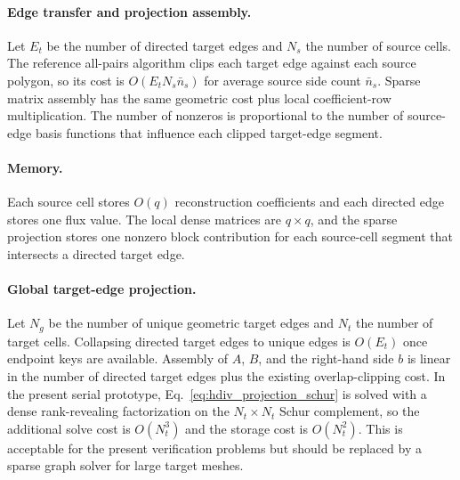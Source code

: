 \documentclass[11pt]{article}
\begin{document}
\paragraph{Edge transfer and projection assembly.}
Let \(E_t\) be the number of directed target edges and \(N_s\) the number of
source cells.  The reference all-pairs algorithm clips each target edge
against each source polygon, so its cost is \(O(E_t N_s \bar n_s)\) for average
source side count \(\bar n_s\).  Sparse matrix assembly has the same geometric
cost plus local coefficient-row multiplication.  The number of nonzeros is
proportional to the number of source-edge basis functions that influence each
clipped target-edge segment.

\paragraph{Memory.}
Each source cell stores \(O(q)\) reconstruction coefficients and each directed
edge stores one flux value.  The local dense matrices are \(q\times q\), and the
sparse projection stores one nonzero block contribution for each source-cell
segment that intersects a directed target edge.

\paragraph{Global target-edge projection.}
Let \(N_g\) be the number of unique geometric target edges and \(N_t\) the
number of target cells.  Collapsing directed target edges to unique edges is
\(O(E_t)\) once endpoint keys are available.  Assembly of \(A\), \(B\), and the
right-hand side \(b\) is linear in the number of directed target edges plus the
existing overlap-clipping cost.  In the present serial prototype,
Eq.~\eqref{eq:hdiv_projection_schur} is solved with a dense rank-revealing
factorization on the \(N_t\times N_t\) Schur complement, so the additional solve
cost is \(O(N_t^3)\) and the storage cost is \(O(N_t^2)\).  This is acceptable
for the present verification problems but should be replaced by a sparse graph
solver for large target meshes.
\end{document}
